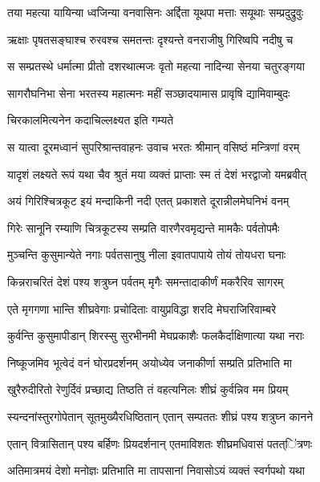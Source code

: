 
\twolineshloka
{तया महत्या यायिन्या ध्वजिन्या वनवासिनः}
{अर्द्दिता यूथपा मत्ताः सयूथाः सम्प्रदुद्रुवुः} %

\twolineshloka
{ऋक्षाः पृषतसङ्घाश्च रुरवश्च समतन्तः}
{दृश्यन्ते वनराजीषु गिरिष्वपि नदीषु च} %

\twolineshloka
{स सम्प्रतस्थे धर्मात्मा प्रीतो दशरथात्मजः}
{वृतो महत्या नादिन्या सेनया चतुरङ्गया} %

\twolineshloka
{सागरौघनिभा सेना भरतस्य महात्मनः}
{महीं सञ्छादयामास प्रावृषि द्यामिवाम्बुदः} %

\onelineshloka
{चिरकालमित्यनेन कदाचिल्लक्ष्यत इति गम्यते} %

\twolineshloka
{स यात्वा दूरमध्वानं सुपरिश्रान्तवाहनः}
{उवाच भरतः श्रीमान् वसिष्ठं मन्त्रिणां वरम्} %

\twolineshloka
{यादृशं लक्ष्यते रूपं यथा चैव श्रुतं मया}
{व्यक्तं प्राप्ताः स्म तं देशं भरद्वाजो यमब्रवीत्} %

\twolineshloka
{अयं गिरिश्चित्रकूट इयं मन्दाकिनी नदी}
{एतत् प्रकाशते दूरान्नीलमेघनिभं वनम्} %

\twolineshloka
{गिरेः सानूनि रम्याणि चित्रकूटस्य सम्प्रति}
{वारणैरवमृद्यन्ते मामकैः पर्वतोपमैः} %

\twolineshloka
{मुञ्चन्ति कुसुमान्येते नगाः पर्वतसानुषु}
{नीला इवातपापाये तोयं तोयधरा घनाः} %

\twolineshloka
{किन्नराचरितं देशं पश्य शत्रुघ्न पर्वतम्}
{मृगैः समन्तादाकीर्णं मकरैरिव सागरम्} %

\twolineshloka
{एते मृगगणा भान्ति शीघ्रवेगाः प्रचोदिताः}
{वायुप्रविद्धा शरदि मेघराजिरिवाम्बरे} %

\twolineshloka
{कुर्वन्ति कुसुमापीडान् शिरस्सु सुरभीनमी}
{मेघप्रकाशैः फलकैर्दाक्षिणात्या यथा नराः} %

\twolineshloka
{निष्कूजमिव भूत्वेदं वनं घोरप्रदर्शनम्}
{अयोध्येव जनाकीर्णा सम्प्रति प्रतिभाति मा} %

\twolineshloka
{खुरैरुदीरितो रेणुर्दिवं प्रच्छाद्य तिष्ठति}
{तं वहत्यनिलः शीघ्रं कुर्वन्निव मम प्रियम्} %

\twolineshloka
{स्यन्दनांस्तुरगोपेतान् सूतमुख्यैरधिष्ठितान्}
{एतान् सम्पततः शीघ्रं पश्य शत्रुघ्न कानने} %

\twolineshloka
{एतान् वित्रासितान् पश्य बर्हिणः प्रियदर्शनान्}
{एतमाविशतः शीघ्रमधिवासं पतत्ऺित्रणः} %

\twolineshloka
{अतिमात्रमयं देशो मनोज्ञः प्रतिभाति मा}
{तापसानां निवासोऽयं व्यक्तं स्वर्गपथो यथा} %

